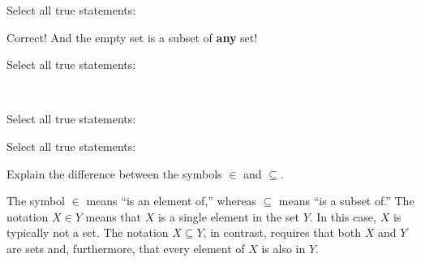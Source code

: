 \documentclass[nooutcomes]{ximera}
\begin{document}
\begin{problem}
Select all true statements: 
\begin{selectAll}
\end{selectAll}
\begin{problem}
Correct!  And the empty set is a subset of \textbf{any} set!  

Select all true statements: 
\begin{selectAll}
 \
\end{selectAll}
\end{problem}
\end{problem}

\begin{problem}
Select all true statements: 
\begin{selectAll}
\choice{$\{2\} \subseteq \{ \{3,2,7\}, \{4,5\}, \{2\}, \emptyset \}$.} 
\end{selectAll}
\begin{problem}
Select all true statements: 
\begin{selectAll}
\choice[correct]{$\emptyset \subseteq \{ \{3,2,7\}, \{4,5\}, \{2\}, \emptyset \}$.}
\end{selectAll}
\end{problem}
\end{problem}

\begin{problem}
Explain the difference between the symbols $\in$ and $\subseteq$.
\begin{freeResponse}
\begin{hint}
The symbol $\in$ means ``is an element of,'' whereas $\subseteq$ means ``is a subset of.'' 
The notation $X \in Y$ means that $X$ is a single element in the set $Y$.  In this case, $X$ is typically not a set.  The notation $X \subseteq Y$, in contrast, requires that both $X$ and $Y$ are sets and, furthermore, that every element of $X$ is also in $Y$.
\end{hint}
\end{freeResponse}
\end{problem}
\end{document}
